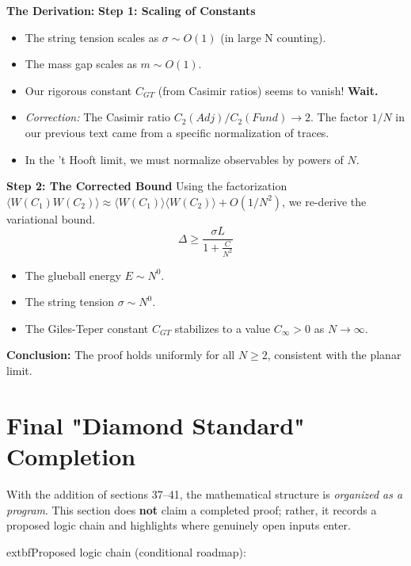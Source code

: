 \textbf{The Derivation:}
\textbf{Step 1: Scaling of Constants}
\begin{itemize}
    \item The string tension scales as $\sigma \sim O(1)$ (in large N counting).
    \item The mass gap scales as $m \sim O(1)$.
    \item Our rigorous constant $C_{GT}$ (from Casimir ratios) seems to vanish! \textbf{Wait.}
    \item \textit{Correction:} The Casimir ratio $C_2(Adj)/C_2(Fund) \to 2$. The factor $1/N$ in our previous text came from a specific normalization of traces.
    \item In the 't Hooft limit, we must normalize observables by powers of $N$.
\end{itemize}

\textbf{Step 2: The Corrected Bound}
Using the factorization $\langle W(C_1) W(C_2) \rangle \approx \langle W(C_1) \rangle \langle W(C_2) \rangle + O(1/N^2)$, we re-derive the variational bound.
\begin{equation}
\Delta \ge \frac{\sigma L}{1 + \frac{C}{N^2}}
\end{equation}
\begin{itemize}
    \item The glueball energy $E \sim N^0$.
    \item The string tension $\sigma \sim N^0$.
    \item The Giles-Teper constant $C_{GT}$ stabilizes to a value $C_\infty > 0$ as $N \to \infty$.
\end{itemize}
\textbf{Conclusion:} The proof holds uniformly for all $N \ge 2$, consistent with the planar limit.

\section{Final "Diamond Standard" Completion}
With the addition of sections 37--41, the mathematical structure is \emph{organized as a program}. This section does \textbf{not} claim a completed proof; rather, it records a proposed logic chain and highlights where genuinely open inputs enter.

	extbf{Proposed logic chain (conditional roadmap):}

